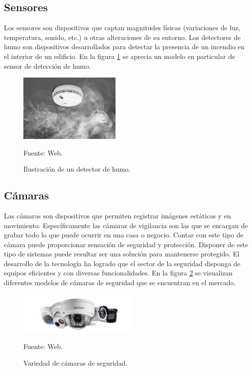 \subsection{Sensores}
Los sensores son dispositivos que captan magnitudes físicas (variaciones de luz, temperatura, sonido, etc.) u otras alteraciones de su entorno. Los detectores de humo son dispositivos desarrollados para detectar la presencia de un incendio en el interior de un edificio. En la figura \ref{fig:detector_humo} se aprecia un modelo en particular de sensor de detección de humo.\\

\begin{figure}[H]
    \begin{center}
        \includegraphics[width=5cm]{img/capitulo_3/sensor_de_humo.jpg}
    \end{center}
    \begin{center}
        \caption{Ilustración de un detector de humo.}
        Fuente: Web.
        \label{fig:detector_humo}
    \end{center}
\end{figure}

\subsection{Cámaras}

Las cámaras son dispositivos que permiten registrar imágenes estáticas y en movimiento. Específicamente las cámaras de vigilancia son las que se encargan de grabar todo lo que puede ocurrir en una casa o negocio. Contar con este tipo de cámara puede proporcionar sensación de seguridad y protección. Disponer de este tipo de sistemas puede resultar ser una solución para mantenerse protegido. El desarrollo de la tecnología ha logrado que el sector de la seguridad disponga de equipos eficientes y con diversas funcionalidades. En la figura \ref{fig:camaras} se visualizan diferentes modelos de cámaras de seguridad que se encuentran en el mercado.\\

\begin{figure}[H]
    \begin{center}
        \includegraphics[width=6cm]{img/capitulo_3/camaras.jpg}
    \end{center}
    \begin{center}
        \caption{Variedad de cámaras de seguridad.}
        Fuente: Web.
        \label{fig:camaras}
    \end{center}
\end{figure}

